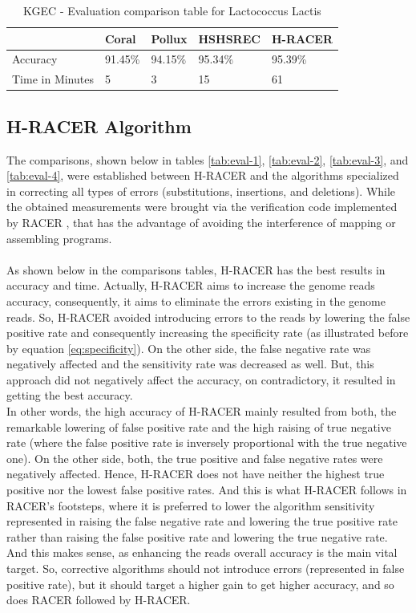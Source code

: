 \documentclass[12pt,openany]{llncs}
\begin{document}
\begingroup
\renewcommand\arraystretch{2}
\begin{longtable}{|m{33mm}|m{20mm}|m{20mm}|m{20mm}|m{20mm}|}
	    \caption{\label{tab:eval-0}KGEC - Evaluation comparison table for Lactococcus Lactis}\\
        \hline
           & Coral & Pollux & HSHSREC & H-RACER\cellcolor{DarkGray} \\ %
        \hline
           Accuracy & 91.45\% & 94.15\% & 95.34\% & 95.39\%\cellcolor{LightGray} \\ %
        \hline
           Time in Minutes& 5 & 3 & 15 & 61\cellcolor{LightGray} \\ %
        \hline
\end{longtable}
\endgroup

\subsection{\label{subsec:eval2-res}H-RACER Algorithm}
The comparisons, shown below in tables \ref{tab:eval-1}, \ref{tab:eval-2}, \ref{tab:eval-3}, and \ref{tab:eval-4}, were established between H-RACER and the algorithms specialized in correcting all types of errors (substitutions, insertions, and deletions). While the obtained measurements were brought via the verification code implemented by RACER \cite{Racer}, that has the advantage of avoiding the interference of mapping or assembling programs. 
\\\\
As shown below in the comparisons tables, H-RACER has the best results in accuracy and time. Actually, H-RACER aims to increase the genome reads accuracy, consequently, it aims to eliminate the errors existing in the genome reads. So, H-RACER avoided introducing errors to the reads by lowering the false positive rate and consequently increasing the specificity rate (as illustrated before by equation \ref{eq:specificity}). On the other side, the false negative rate was negatively affected and the sensitivity rate was decreased as well. But, this approach did not negatively affect the accuracy, on contradictory, it resulted in getting the best accuracy.
\\
In other words, the high accuracy of H-RACER mainly resulted from both, the remarkable lowering of false positive rate and the high raising of true negative rate (where the false positive rate is inversely proportional with the true negative one). On the other side, both, the true positive and false negative rates were negatively affected. Hence, H-RACER does not have neither the highest true positive nor the lowest false positive rates. And this is what H-RACER follows in RACER's footsteps, where it is preferred to lower the algorithm sensitivity represented in raising the false negative rate and lowering the true positive rate rather than raising the false positive rate and lowering the true negative rate. And this makes sense, as enhancing the reads overall accuracy is the main vital target. So, corrective algorithms should not introduce errors (represented in false positive rate), but it should target a higher gain to get higher accuracy, and so does RACER followed by H-RACER.
\end{document}
